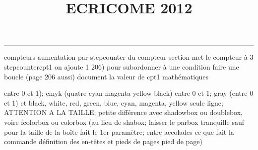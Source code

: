 \documentclass[11pt]{article}%
\title{\bf \vspace{-2cm} ECRICOME 2012} %
\author{} %
\date{} %
\renewcommand{\headrulewidth}{0pt}%
\renewcommand{\footrulewidth}{0.4pt}%
\begin{document}
\maketitle %
\vspace{-1.4cm}\hrule %
\thispagestyle{fancy}

\vspace*{.2cm}



compteurs%
aumentation par stepcounter du compteur section%
met le compteur à 3%
stepcounter{cpt1} on ajoute 1%
206) pour subordonner à une condition %
faire une boucle (page 206 aussi) %
document la valeur de cpt1 
mathématiques\newcommand{\ch}{\operatorname{ch}} 
\newcommand{\sh}{\operatorname{sh}}
\renewcommand{\tanh}{\operatorname{th}}
\renewcommand{\sinh}{\operatorname{sh}}
\renewcommand{\cosh}{\operatorname{ch}}
\newcommand{\argsh}{\operatorname{argsh}}
\newcommand{\argch}{\operatorname{argch}}
\newcommand{\argth}{\operatorname{argth}}
\newcommand{\Id}{\operatorname{Id}}
\renewcommand{\leq}{\leq}
\renewcommand{\geq}{\geq }

\newcommand{\dlim}{\lim}
\newcommand{\dsum}{\sum}
\newcommand{\dint}{\int}
\newcommand{\dprod}{\prod}



entre 0 et 1); cmyk (quatre cyan magenta yellow black) entre 0 et 1;
gray (entre 0 et 1) et black, white, red, green, blue, cyan, magenta,
yellow%
seule ligne; ATTENTION A LA TAILLE; petite différence avec shadowbox ou
doublebox, voire fcolorbox ou colorbox (au lieu de shabox; laisser le
parbox tranquille sauf pour la taille de la boîte
\newcommand{\Tbox}[1]{\begin{center} \shabox{\parbox{0.6
\linewidth}{#1}} \end{center}} %
fait le 1er paramètre; entre accolades ce que fait la commande
définition des en-têtes et pieds de pages\pagestyle{fancy}
\chead{}
\rfoot[ \ \thepage]{\thepage}
\cfoot{}
\lfoot{}
\thispagestyle{fancy} %
pied de page)\renewcommand{\footrulewidth}{0.4pt}
\renewcommand{\headrulewidth}{0.4pt}
\end{document}
